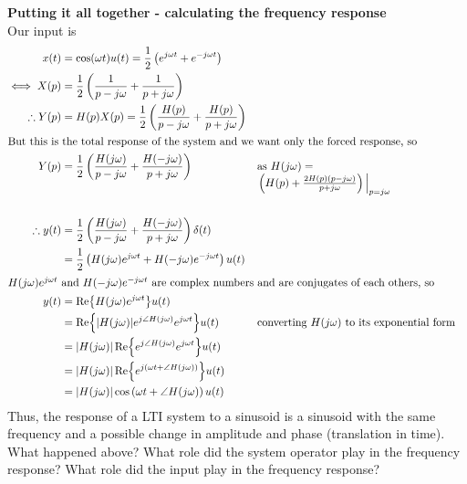 \documentclass{report}
\begin{document}
\textbf{Putting it all together - calculating the frequency response} \\
Our input is 
\begin{align*}
    x(t) &= \cos(\omega t)u(t) = \frac{1}{2}\left(e^{\jwt} + e^{-\jwt}\right) \\
    \iff X(p) &= \frac{1}{2}\left(\frac{1}{p-j\omega} + \frac{1}{p + j\omega}\right) \\
    \therefore Y(p) &= H(p)X(p) = \frac{1}{2}\left(\frac{H(p)}{p-j\omega} + \frac{H(p)}{p + j\omega}\right) \\
    \intertext{But this is the total response of the system and we want only the forced response, so}
    Y(p) &= \frac{1}{2}\left(\frac{H(j\omega)}{p-j\omega} + \frac{H(-j\omega)}{p + j\omega}\right) && \begin{tabular}[t]{@{}l@{}}
                         as $H(j\omega) =$ \\
                          $\eval{\left(H(p) + \frac{2H(p)(p - j\omega)}{p + j\omega}\right)}_{p = j\omega}$ 
                         \end{tabular} \\\\ 
    \therefore y(t) &= \frac{1}{2}\left(\frac{H(j\omega)}{p-j\omega} + \frac{H(-j\omega)}{p + j\omega}\right)\delta(t) \\
    &= \frac{1}{2}\left(H(j\omega)e^{\jwt} + H(-j\omega)e^{-\jwt}\right)u(t) \\
    \intertext{$H(j\omega)e^{\jwt}$ and $H(-j\omega)e^{-\jwt}$ are complex numbers and are conjugates of each others, so}
    y(t) &= \Re{H(j\omega)e^{\jwt}}u(t) \\
        &= \Re{\abs{H(j\omega)}e^{j \angle H(j\omega)}e^{\jwt}}u(t) && \text{converting $H(j\omega)$ to its exponential form}\\
        &= \abs{H(j\omega)}\Re{e^{j \angle H(j\omega)}e^{\jwt}}u(t) \\
        &= \abs{H(j\omega)}\Re{e^{j (\omega t + \angle H(j\omega))}}u(t) \\
        &= \abs{H(j\omega)}\cos\left(\omega t + \angle H(j\omega)\right)u(t)
\end{align*}
Thus, the response of a LTI system to a sinusoid is a sinusoid with the same frequency and a possible change in amplitude and phase (translation in time). \smallskip \\
What happened above? What role did the system operator play in the frequency response? What role did the input play in the frequency response? \smallskip \\
\end{document}
